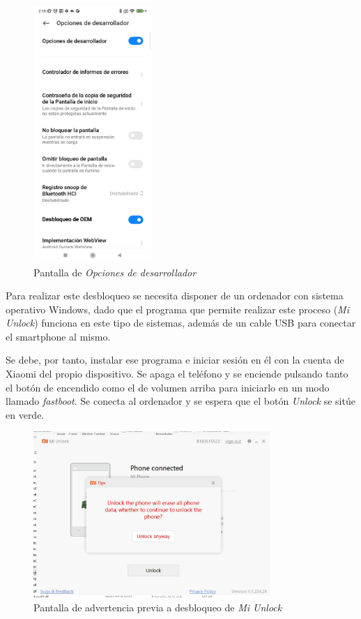 \documentclass[12pt,a4paper,onecolumn,oneside]{report}
\begin{document}
\begin{figure}[H] 
\centering
  \includegraphics[width=0.4\textwidth]{figuras/root2.png}
  \caption[Pantalla de \textit{Opciones de desarrollador}]{Pantalla de \textit{Opciones de desarrollador}\\
  }
  \label{fig:root2}
\end{figure}

Para realizar este desbloqueo se necesita disponer de un ordenador con sistema operativo Windows, dado que el programa que permite realizar este proceso (\textit{Mi Unlock}) funciona en este tipo de sistemas, además de un cable USB para conectar el smartphone al mismo.

Se debe, por tanto, instalar ese programa e iniciar sesión en él con la cuenta de Xiaomi del propio dispositivo. Se apaga el teléfono y se enciende pulsando tanto el botón de encendido como el de volumen arriba para iniciarlo en un modo llamado \textit{fastboot}. Se conecta al ordenador y se espera que el botón \textit{Unlock} se sitúe en verde.

\begin{figure}[H] 
\centering
  \includegraphics[width=0.8\textwidth]{figuras/root3.png}
  \caption[Pantalla de advertencia previa a desbloqueo de \textit{Mi Unlock}]{Pantalla de advertencia previa a desbloqueo de \textit{Mi Unlock}\\
  }
  \label{fig:root3}
\end{figure}
\end{document}
